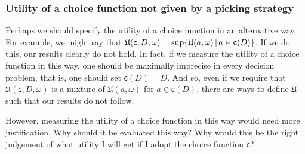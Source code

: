 \documentclass[a4paper]{article}
\newcommand\U{\mathfrak{U}} %
\renewcommand\c{\mathsf{c}} %
\newcommand{\todoold}[2][]{\todo[backgroundcolor=white,bordercolor=orange!10,linecolor=gray!10, #1,caption={},textcolor=gray]{Pre-rev: #2}}
\newcommand\SetDelimiter[1][]{
	\nonscript\,#1\vert \allowbreak \nonscript\,\mathopen{}}
\providecommand\given{\SetDelimiter}
\newenvironment{CCM rewritten}
{\begingroup\color{blue}} %
{\endgroup}              %
\begin{document}
%
%
%
%
\subsubsection{Utility of a choice function not given by a picking strategy}

Perhaps we should specify the utility of a choice function in an alternative way. %
For example, we might say that $\U(\c,D,\omega)=\sup\{\U(a,\omega)\given a\in \c(D)\}$. If we do this, our results clearly do not hold. In fact, if we measure the utility of a choice function in this way, one should be maximally imprecise in every decision problem, that is, one should set $\c(D)=D$. And so, even if we require that $\U(\c,D,\omega)$ is a mixture of $\U(a,\omega)$ for $a\in\c(D)$, there are ways to define $\U$ such that our results do not follow. 

However, measuring the utility of a choice function in this way would need more justification. Why should it be evaluated this way?
Why would this be the right judgement of what utility I will get if I adopt the choice function $\c$?
\end{document}
